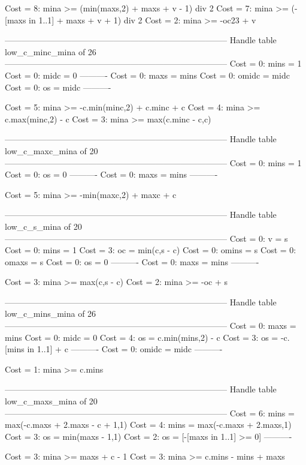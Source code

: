 Cost =  8:  mina >= (min(maxs,2) + maxs + v - 1) div 2
Cost =  7:  mina >= (-[maxs in 1..1] + maxs + v + 1) div 2
Cost =  2:  mina >= -oc23 + v

--------------------------------------------------------------------------------
Handle table low_c_minc_mina of 26
--------------------------------------------------------------------------------
Cost =  0:  mins  = 1
Cost =  0:  midc  = 0
----------
Cost =  0:  maxs  = mins
Cost =  0:  omidc = midc
Cost =  0:  os    = midc
----------

Cost =  5:  mina >= -c.min(minc,2) + c.minc + c
Cost =  4:  mina >= c.max(minc,2) - c
Cost =  3:  mina >= max(c.minc - c,c)

--------------------------------------------------------------------------------
Handle table low_c_maxc_mina of 20
--------------------------------------------------------------------------------
Cost =  0:  mins = 1
Cost =  0:  os   = 0
----------
Cost =  0:  maxs = mins
----------

Cost =  5:  mina >= -min(maxc,2) + maxc + c

--------------------------------------------------------------------------------
Handle table low_c_s_mina of 20
--------------------------------------------------------------------------------
Cost =  0:  v     = s
Cost =  0:  mins  = 1
Cost =  3:  oc    = min(c,s - c)
Cost =  0:  omins = s
Cost =  0:  omaxs = s
Cost =  0:  os    = 0
----------
Cost =  0:  maxs  = mins
----------

Cost =  3:  mina >= max(c,s - c)
Cost =  2:  mina >= -oc + s

--------------------------------------------------------------------------------
Handle table low_c_mins_mina of 26
--------------------------------------------------------------------------------
Cost =  0:  maxs  = mins
Cost =  0:  midc  = 0
Cost =  4:  os    = c.min(mins,2) - c
Cost =  3:  os    = -c.[mins in 1..1] + c
----------
Cost =  0:  omidc = midc
----------

Cost =  1:  mina >= c.mins

--------------------------------------------------------------------------------
Handle table low_c_maxs_mina of 20
--------------------------------------------------------------------------------
Cost =  6:  mins = max(-c.maxs + 2.maxs - c + 1,1)
Cost =  4:  mins = max(-c.maxs + 2.maxs,1)
Cost =  3:  os   = min(maxs - 1,1)
Cost =  2:  os   = [-[maxs in 1..1] >= 0]
----------

Cost =  3:  mina >= maxs + c - 1
Cost =  3:  mina >= c.mins - mins + maxs

